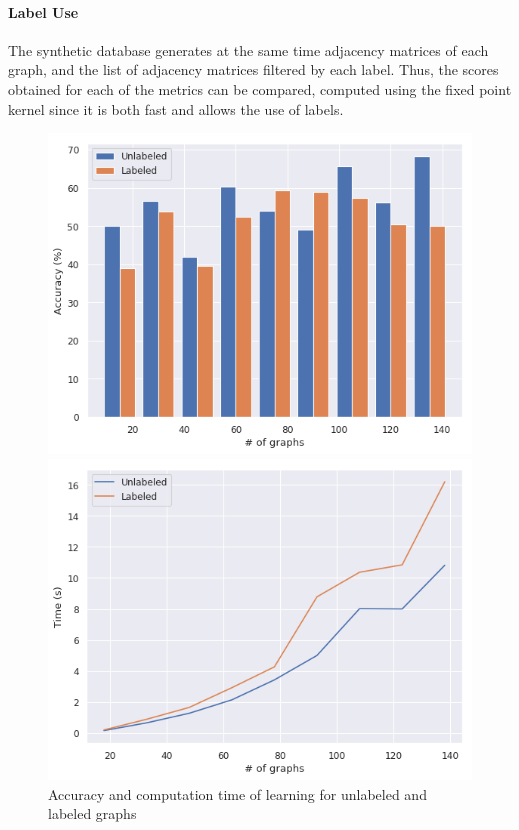 \documentclass{article}
\theoremstyle{definition}
\begin{document}
\paragraph{Label Use}
The synthetic database generates at the same time adjacency matrices of each graph, and the list of adjacency matrices filtered by each label. Thus, the scores obtained for each of the metrics can be compared, computed using the fixed point kernel since it is both fast and allows the use of labels.
\begin{figure}[!htb]
	\begin{multicols}{2}
		\includegraphics[width=\linewidth]{data/lab_nolab/acc.png}\par
		\includegraphics[width=\linewidth]{data/lab_nolab/time.png}\par
	\end{multicols}
\caption {Accuracy and computation time of learning for unlabeled and labeled graphs}
\end{figure}
\end{document}
